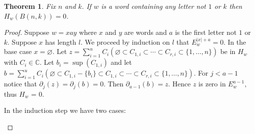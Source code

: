 \documentclass{amsart}
\newtheorem{theorem}{Theorem}[section]
\newcommand{\C}{\mathbb{C}}
\begin{document}
  \begin{theorem} Fix $n$ and $k$. If $w$ is a word containing any letter not $1$ or $k$ then 
    $H_w(B(n, k)) = 0$.
  \end{theorem}
  \begin{proof} Suppose $w = xay$ where $x$ and $y$ are words and $a$ is the first letter not 
    $1$ or $k$.
    Suppose $x$ has length $l$. We proceed by induction on $l$ that $E^{|x|+a}_w = 0$. 
    In the base case $x = \varnothing$. Let $z = \sum_{i=1}^u C_i (\varnothing \subset C_{1,i} 
    \subset \cdots \subset C_{r,i} \subset \{1, \ldots, n\})$ be in $H_w$ with $C_i \in \C$. Let 
    $b_i =\sup(C_{1,i})$
    and let $b = \sum_{i=1}^u C_i (\varnothing \subset C_{1,i}-\{b_i\} \subset C_{1,i} \subset 
    \cdots \subset C_{r,i} \subset \{1, \ldots, n\})$. For $j < a-1$ notice that 
    $\partial_j(z)=\partial_j(b) = 0$. Then $\partial_{a-1}(b) = z$. Hence $z$ is zero in 
    $E^{a-1}_w$, thus $H_w$ = 0.

    In the induction step we have two cases:
    \begin{enumerate}
      

\end{enumerate}
\end{proof}
\end{document}

